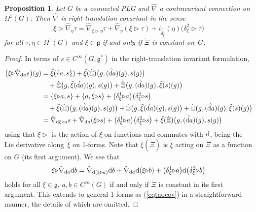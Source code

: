 \documentclass[pdftex]{sigma}
\numberwithin{equation}{section}
\newtheorem{Proposition}[Theorem]{Proposition}
 { \theoremstyle{definition}
\newtheorem{Definition}[Theorem]{Definition}
\newtheorem{Example}[Theorem]{Example}
\newtheorem{Remark}[Theorem]{Remark} }
\newcommand{\<}{{\langle}}
\renewcommand{\>}{{\rangle}}
\newcommand{\extd}{{\rm d}}
\newcommand{\la}{{\triangleright}}
\newcommand{\cg}{{\mathfrak{g}}}
\newcommand{\tilder}{\grave}
\begin{document}
\begin{Proposition}\label{taocovarianceprop} Let $G$ be a connected PLG and $\hat\nabla$ a contravariant connection on $\Omega^1(G)$. Then $\hat\nabla$ is right-translation covariant in the sense
\begin{equation}\label{eqtaocov}\xi\la\hat\nabla_{\eta}\tau=\hat\nabla_{\xi\la\eta}\tau+\hat\nabla_{\eta}(\xi\la\tau) +i_{\tilde{\delta_\xi^1}}(\eta)\big(\delta_\xi^2\la\tau\big)
\end{equation}
for all $\tau,\eta\in\Omega^1(G)$ and $\xi\in\cg$ if and only if $\tilder\Xi$ is constant on~$G$.
\end{Proposition}
\begin{proof} In terms of $s\in C^\infty(G,\cg^*)$ in the right-translation invariant formulation,
\begin{align*} \big(\xi\la\tilder\nabla_{\extd a}s\big)(g)&=\tilde\xi(\{a,s\})+\tilde\xi(\tilder\Xi)\big(g,\tilder{(\extd a)}(g),s(g)\big)\\
&\quad {}+\tilder\Xi\big(g,\tilde\xi(\tilder{\extd a})(g),s(g)\big)+\tilder\Xi\big(g,\tilder{(\extd a)}(g),\tilde\xi(s)(g)\big)\\
&=\{\xi\la a,s\}+\{a,\xi\la s\}+\big(\delta^1_\xi\la a\big)\big(\delta^2_\xi\la s\big)\\
&\quad{}+\tilde\xi(\tilder\Xi)\big(g,\tilder{(\extd a)}(g),s(g)\big)+\tilder\Xi\big(g,\tilde\xi(\tilder{\extd a})(g),s(g)\big)+\tilder\Xi\big(g,\tilder{(\extd a)}(g),\tilde\xi(s)(g)\big)\\
&=\tilder\nabla_{\extd \xi\la a}s+\tilder\nabla_{\extd a}(\xi\la s)+\big(\delta^1_\xi\la a\big)\big(\delta^2_\xi\la s\big) +\tilde\xi(\tilder\Xi)\big(g,\tilder{(\extd a)}(g),s(g)\big)\end{align*}
using that $\xi\la$ is the action of $\tilde\xi$ on functions and commutes with $\extd$, being the Lie derivative along~$\tilde\xi$ on 1-forms. Note that $\tilde\xi(\tilder\Xi)$ is $\tilde\xi$ acting on $\tilder\Xi$ as a function on $G$ (its first argument). We see that
\begin{equation}\label{covcon}
\xi\la\hat\nabla_{\extd a}\extd b=\hat\nabla_{\extd(\xi\la a)}\extd b+\hat\nabla_{\extd a}\extd(\xi\la b)+\big(\delta_\xi^1\la a\big)\extd\big(\delta_\xi^2\la b\big)
\end{equation}
holds for all $\xi\in\cg$, $a,b\in C^\infty(G)$ if and only if $\tilder\Xi$ is constant in its first argument. This extends to general 1-forms as (\ref{eqtaocov}) in a straightforward manner, the details of which are omitted. \end{proof}
\end{document}
